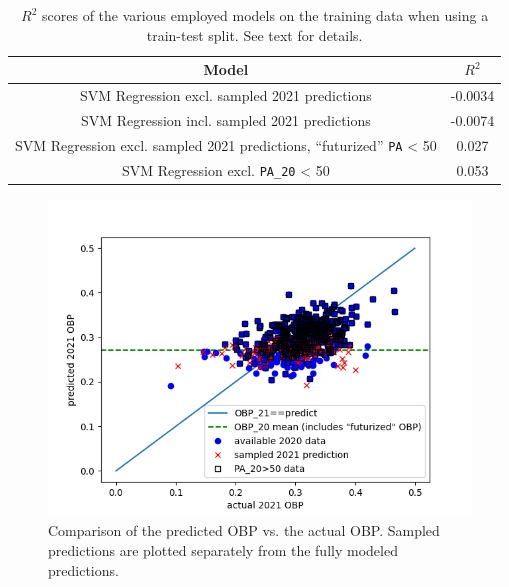 \documentclass[paper=a4, fontsize=11pt]{scrartcl} %
\begin{document}
\begin{table}
\begin{center}
\begin{tabular}{ |c|c| }
 \hline
 Model & $R^2$\\ [0.5ex] 
 \hline
 \hline
 SVM Regression excl. sampled 2021 predictions & -0.0034\\
 SVM Regression incl. sampled 2021 predictions & -0.0074\\
 SVM Regression excl. sampled 2021 predictions, ``futurized'' \texttt{PA} < 50 & 0.027\\
 SVM Regression excl. \texttt{PA\_20} < 50 & 0.053\\



 \hline
\end{tabular} \label{tab:predict}
\caption{$R^2$ scores of the various employed models on the training data when using a train-test split. See text for details.}
\end{center}
\end{table}

\begin{figure}
    \centering
    \includegraphics[width=15cm]{code/results.png}
    \caption{Comparison of the predicted OBP vs. the actual OBP. Sampled predictions are plotted separately from the fully modeled predictions.}
    \label{fig:results}
\end{figure}






\end{document}
